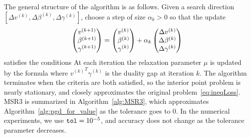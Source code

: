 The general structure of the algorithm is as follows.
Given a search direction
$[\Delta v^{(k)}, \Delta \beta^{(k)}, \Delta \gamma^{(k)}]$, 
choose a step of size $\alpha_k>0$
so that the update
\[
\begin{pmatrix}
v^{(k+1)}\\ \beta^{(k+1)}\\ \gamma^{(k+1)}
\end{pmatrix}
=
\begin{pmatrix}
v^{(k)}\\ \beta^{(k)}\\ \gamma^{(k)}
\end{pmatrix}
+\alpha_k
\begin{pmatrix}
\Delta v^{(k)}\\ \Delta\beta^{(k)}\\ \Delta\gamma^{(k)}
\end{pmatrix}
\]
satisfies the conditions
At each iteration the relaxation parameter $\mu$ is updated by the formula 
where ${v^{(k)}}^T\gamma^{(k)}$ is the duality gap at
iteration $k$. The algorithm terminates when the criteria 
are both satisfied, so the interior point problem is nearly stationary, and closely approximates the original problem~\eqref{eq:ineqLoss}.
MSR3 is summarized in Algorithm~\ref{alg:MSR3}, which approximates Algorithm~\ref{alg:pgd_for_value} as the tolerance goes to $0$. 
In the numerical experiments, we use $\text{\texttt{tol}} = 10^{-5}$, and accuracy does not change as the tolerance parameter decreases.  

